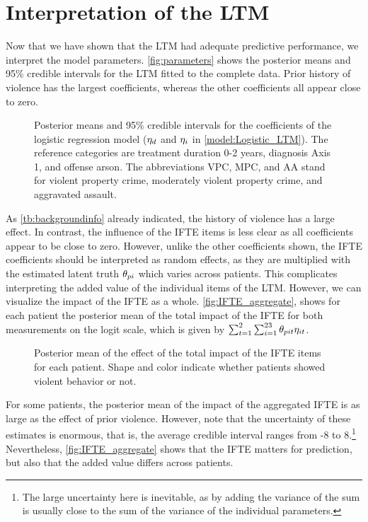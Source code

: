\documentclass[a4paper,11pt]{article}
\begin{document}
\section{Interpretation of the LTM}
Now that we have shown that the LTM had adequate predictive performance, we interpret the model parameters.
\autoref{fig:parameters} shows the posterior means and 95\% credible intervals for the LTM fitted to the complete data.
Prior history of violence has the largest coefficients, whereas the other coefficients all appear close to zero.
\begin{figure}[!ht]
    \centering
    
    \caption{Posterior means and 95\% credible intervals for the coefficients of the logistic regression model ($\eta_{d}$ and $\eta_{i}$ in \autoref{model:Logistic_LTM}). The reference categories are treatment duration 0-2 years, diagnosis Axis 1, and offense arson. The abbreviations VPC, MPC, and AA stand for violent property crime, moderately violent property crime, and aggravated assault.}
    \label{fig:parameters}
\end{figure}
As \autoref{tb:backgroundinfo} already indicated, the history of violence has a large effect.
In contrast, the influence of the IFTE items is less clear as all coefficients appear to be close to zero.
However, unlike the other coefficients shown, the IFTE coefficients should be interpreted as random effects, as they are multiplied with the estimated latent truth $\theta_{pi}$ which varies across patients.
This complicates interpreting the added value of the individual items of the LTM.
However, we can visualize the impact of the IFTE as a whole. %
\autoref{fig:IFTE_aggregate}, shows for each patient the posterior mean of the total impact of the IFTE for both measurements on the logit scale, which is given by $\sum_{t=1}^2\sum_{i=1}^{23}\theta_{pit}\eta_{it}$.
\begin{figure}[!ht]
    \centering
    
    \caption{Posterior mean of the effect of the total impact of the IFTE items for each patient. Shape and color indicate whether patients showed violent behavior or not.}
    \label{fig:IFTE_aggregate}
\end{figure}
For some patients, the posterior mean of the impact of the aggregated IFTE is as large as the effect of prior violence.
However, note that the uncertainty of these estimates is enormous, that is, the average credible interval ranges from -8 to 8.\footnote{The large uncertainty here is inevitable, as by adding the variance of the sum is usually close to the sum of the variance of the individual parameters.}
Nevertheless, \autoref{fig:IFTE_aggregate} shows that the IFTE matters for prediction, but also that the added value differs across patients.
\end{document}
